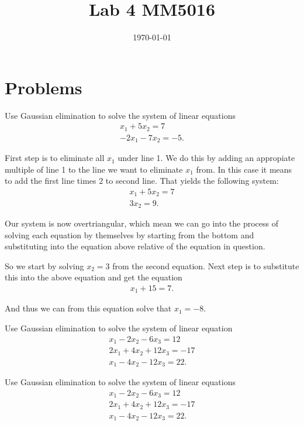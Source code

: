 \documentclass[10pt]{article}
\date{\today}
\title{Lab 4 MM5016}
\begin{document}
\maketitle


\section{Problems}
\label{sec:org2f6b97e}

\begin{exercise}[System 1]  \label{exe:System_1}
Use Gaussian elimination to solve the system of linear equations
\begin{align*}
x_1 + 5x_2 = 7 \\
-2x_1 -7x_2 = -5
.
\end{align*}
\end{exercise}
\begin{solution}[]  \label{sol:}
First step is to eliminate all \(x_1\) under line 1. We do this by
adding an appropiate multiple of line 1 to the line we
want to eliminate \(x_1\) from. In this case it means to add the first
line times 2 to second line. That yields the following system:
\begin{align*}
x_1 + 5x_2 = 7 \\
3x_2 = 9
.
\end{align*}

Our system is now overtriangular, which mean we can go into
the process of solving each equation by themselves by starting
from the bottom and substituting into the equation above
relative of the equation in question.


So we start by solving \(x_2 = 3\) from the second equation. Next step is
to substitute this into the above equation and get the equation
\begin{align*}
x_1 + 15 = 7
.
\end{align*}

And thus we can from this equation solve that \(x_1 = -8\).

\end{solution}
\begin{exercise}[System 2]  \label{exe:System_2}
Use Gaussian elimination to solve the system of linear equation
\begin{align*}
x_1 - 2x_2 - 6x_3 = 12 \\
2x_1 + 4x_2 + 12x_3 = -17 \\
x_1 - 4x_2 - 12x_3 = 22
.
\end{align*}
\end{exercise}
\begin{exercise}[System 3]  \label{exe:System_3}
Use Gaussian elimination to solve the system of linear equations
\begin{align*}
x_1 - 2x_2 -6x_3 = 12 \\
2x_1 + 4x_2 + 12x_3 = -17 \\
x_1 - 4x_2 - 12x_3 = 22
.
\end{align*}
\end{exercise}
\end{document}
